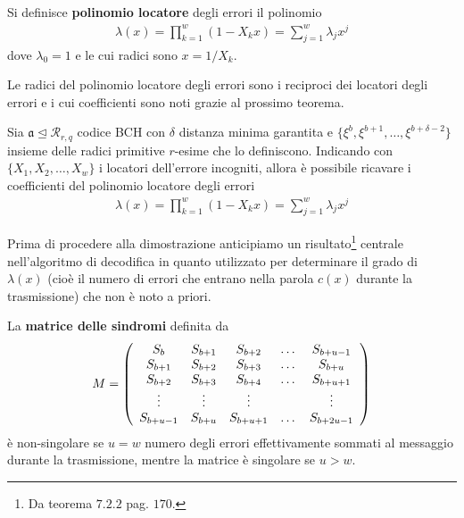 \begin{definizione}
   Si definisce {\bf polinomio locatore} degli errori il polinomio
   \begin{align*}
      \lambda (x) = \prod_{k=1}^{w} (1 - X_{k}x)= \sum_{j=1}^{w}\lambda_{j}x^{j}
   \end{align*}
   dove $\lambda_{0} = 1$ e le cui radici sono $x = 1/X_{k}$.
\end{definizione}
Le radici del polinomio locatore degli errori sono i reciproci dei locatori degli errori e i cui coefficienti sono noti grazie al prossimo teorema.
\begin{teorema}\label{teo:poliLocatore}
   Sia $\mathfrak{a} \trianglelefteq  \mathcal{R}_{r,q} $ codice BCH con $\delta$ distanza minima garantita e $\lbrace \xi^{b}, \xi^{b+1}, \dots , \xi^{b + \delta - 2} \rbrace$ insieme delle radici primitive $r$-esime che lo definiscono. Indicando con $\lbrace X_{1}, X_{2}, \dots , X_{w} \rbrace$ i locatori dell'errore incogniti, allora è possibile ricavare i coefficienti del polinomio locatore degli errori
   \begin{align*}
      \lambda (x) = \prod_{k=1}^{w} (1 - X_{k}x)= \sum_{j=1}^{w}\lambda_{j}x^{j}
   \end{align*}
\end{teorema}
Prima di procedere alla dimostrazione anticipiamo un risultato\footnote{Da \cite{blahut} teorema $7.2.2$ pag. $170$.} centrale nell'algoritmo di decodifica in quanto utilizzato per determinare il grado di $\lambda (x)$ (cioè il numero di errori che entrano nella parola $c(x)$ durante la trasmissione) che non è noto a priori.
\begin{lemmax}\label{le:matriceSindromi}
   La {\bf matrice delle sindromi} definita da
   \begin{align*}
        M =
 	\left(
 	\begin{array} {c c c c c}
 	S_{b} & S_{b + 1} & S_{b + 2} & \dots & S_{b + u - 1}   \\
        S_{b + 1} & S_{b + 2} & S_{b + 3} & \dots & S_{b+u}   \\
        S_{b + 2} & S_{b + 3} & S_{b + 4} & \dots & S_{b + u + 1}   \\
        \vdots & \vdots & \vdots &  & \vdots   \\
        S_{b + u - 1} & S_{b + u} & S_{b + u +1} & \dots & S_{b + 2u -1}
 	\end{array}
 	\right)
     \end{align*}
     è non-singolare se $u=w$ numero degli errori effettivamente sommati al messaggio durante la trasmissione, mentre la matrice è singolare se $u > w$.
\end{lemmax}

